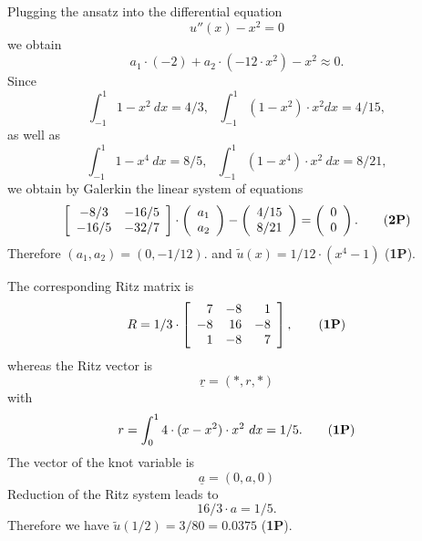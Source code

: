 \begin{loesung}
\begin{teilaufgaben}
\item
Plugging the ansatz into the differential equation
\[
u''(x) - x^2 = 0
\]
we obtain
\[
a_1 \cdot (-2) + a_2 \cdot (-12 \cdot x^2) - x^2 \approx 0.
\]
Since
\[
\int_{-1}^1 1 - x^2 \ dx = 4/3, \ \ \ \int_{-1}^1 (1-x^2) \cdot x^2 dx = 4/15,
\]
as well as
\[
\int_{-1}^1 1 - x^4 \ dx = 8/5, \ \ \ \int_{-1}^1 (1 - x^4) \cdot x^2 \ dx = 8/21,
\]
we obtain by Galerkin the linear system of equations
\begin{equation}
\left[\begin{array}{cc}  -8/3 & -16/5 \\  -16/5 & -32/7  \end{array}\right]
\cdot
\left(\begin{array}{r} a_1 \\ a_2 \end{array}\right)
-
\left(\begin{array}{c} 4/15 \\ 8/21 \end{array}\right)
=
\left(\begin{array}{r} 0 \\ 0 \end{array}\right).
\tag{\textbf{2P}}
\end{equation}
Therefore $(a_1, a_2) = (0, -1/12).$
and
$\tilde u(x) =  1/12 \cdot (x^4 - 1)$ (\textbf{1P}).

\item
The corresponding Ritz matrix is
\begin{equation}
R
=
1/3
\cdot
\left[\begin{array}{rrr}
 7 & -8 &  1 \\
-8 & 16 & -8 \\
 1 & -8 &  7
\end{array}\right],
\tag{\textbf{1P}}
\end{equation}
whereas the Ritz vector is
\[
\underline{r} = (*,r,*)
\]
with
\begin{equation}
r = \int_0^1 4 \cdot (x - x^2) \cdot x^2 \ dx = 1/5.
\tag{\textbf{1P}}
\end{equation}
The vector of the knot variable is
\[
\underline{a} = (0, a, 0)
\]
Reduction of the Ritz system leads to  
\[
16/3 \cdot a = 1/5.
\]
Therefore we have
$\tilde u(1/2) = 3/80 = 0.0375$
(\textbf{1P}).
\qedhere
\end{teilaufgaben}
\end{loesung}

